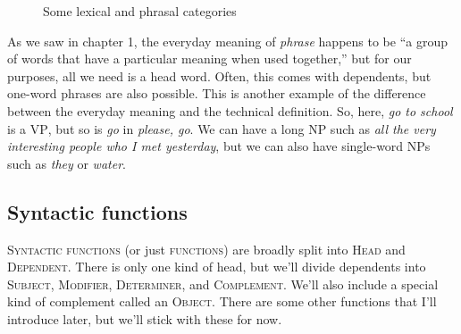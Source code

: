 \begin{figure}[h]
    \centering
    \caption{Some lexical and phrasal categories}
    \label{fig:categories}
\end{figure}\label{fig:projections}

As we saw in chapter 1, the everyday meaning of \textit{phrase} happens to be ``a group of words that have a particular meaning when used together,'' but for our purposes, all we need is a head word. Often, this comes with dependents, but one-word phrases are also possible. This is another example of the difference between the everyday meaning and the technical definition. So, here, \textit{go to school} is a \textsc{VP}, but so is \textit{go} in \textit{please, go}. We can have a long NP such as \textit{all the very interesting people who I met yesterday}, but we can also have single-word NPs such as \textit{they} or \textit{water}.

\subsection{Syntactic functions}

\textsc{Syntactic functions} (or just \textsc{functions}) are broadly split into \textsc{Head} and \textsc{Dependent}. There is only one kind of head, but we'll divide dependents into \textsc{Subject}, \textsc{Modifier}, \textsc{Determiner}, and \textsc{Complement}. We'll also include a special kind of complement called an \textsc{Object}. There are some other functions that I'll introduce later, but we'll stick with these for now.

